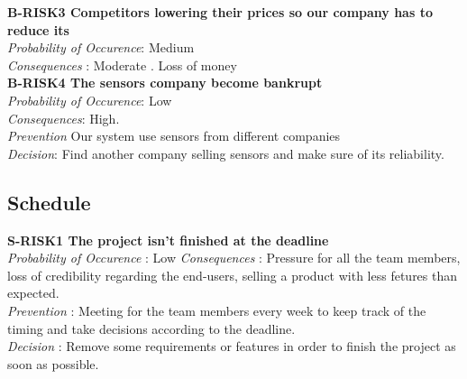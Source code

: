 	\textbf{ B-RISK3 Competitors lowering their prices so our company has to reduce its} \\
	\textit{Probability of Occurence}: Medium \\
	\textit{Consequences} : Moderate . Loss of money \\
	
	\textbf{ B-RISK4 The sensors company become bankrupt} \\
	\textit{Probability of Occurence}: Low \\
	\textit{Consequences}: High.\\
	\textit{Prevention} Our system use sensors from different companies \\
	\textit{Decision}: Find another company selling sensors and make sure of its reliability. \\


\subsection{Schedule}


	\textbf{ S-RISK1 The project isn't finished at the deadline} \\
	\textit {Probability of Occurence}  : Low
	\textit{Consequences} : Pressure for all the team members, loss of credibility regarding the end-users, selling a product with less fetures than expected.\\
	\textit{Prevention} : Meeting for the team members every week to keep track of the timing and take decisions according to the deadline. \\
	\textit{Decision} : Remove some requirements or features in order to finish the project as soon as possible.\\




